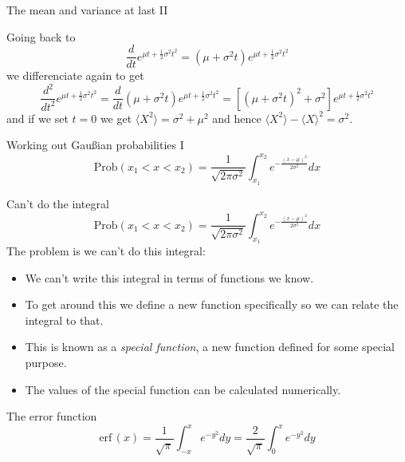 \documentclass{beamer}
\begin{document}
\begin{frame}{The mean and variance at last II}

Going back to
\color{reddish}{}
$$
\frac{d}{dt}e^{\mu t + \frac{1}{2}\sigma^2 t^2}=(\mu+\sigma^2 t)e^{\mu t + \frac{1}{2}\sigma^2 t^2}
$$
\color{black}{}
we differenciate again to get
\color{reddish}
$$
\frac{d^2}{dt^2}e^{\mu t + \frac{1}{2}\sigma^2 t^2}=\frac{d}{dt}(\mu+\sigma^2 t)e^{\mu t + \frac{1}{2}\sigma^2 t^2}=[(\mu+\sigma^2 t)^2+\sigma^2]e^{\mu t + \frac{1}{2}\sigma^2 t^2}
$$
\color{black}{}
and if we set \color{reddish}$t=0$\color{black}{} we get \color{reddish}$\langle X^2\rangle =\sigma^2+\mu^2$\color{black}{} and
hence \color{reddish}$\langle X^2\rangle-\langle X\rangle^2=\sigma^2$\color{black}{}.

\end{frame}

\begin{frame}{Working out Gau\ss{}ian probabilities I}
\color{purple}
$$
\mbox{Prob}(x_1<x<x_2)=\frac{1}{\sqrt{2\pi\sigma^2}}\int_{x_1}^{x_2} e^{-\frac{(x-\mu)^2}{2\sigma^2}}dx
$$
\vskip -1cm
\color{black}
\begin{center}

\end{center}
\end{frame}


\begin{frame}{Can't do the integral}
\color{reddish}
$$
\mbox{Prob}(x_1<x<x_2)=\frac{1}{\sqrt{2\pi\sigma^2}}\int_{x_1}^{x_2} e^{-\frac{(x-\mu)^2}{2\sigma^2}}dx
$$
\color{black}
The problem is we can't do this integral:
\begin{itemize}
\item We can't write this integral in terms of functions we know.
\item To get around this we define a new function specifically so we can relate the integral to that.
\item This is known as a \textsl{special function}, a new function defined for some special purpose.
\item The values of the special function can be calculated numerically.
\end{itemize}
\end{frame}


\begin{frame}{The error function}
\color{purple}
$$
\mbox{erf}\,(x)=\frac{1}{\sqrt{\pi}}\int_{-x}^xe^{-y^2}dy=\frac{2}{\sqrt{\pi}}\int_0^xe^{-y^2}dy
$$
\vskip -1cm
\color{black}
\begin{center}

\end{center}
\end{frame}
\end{document}
